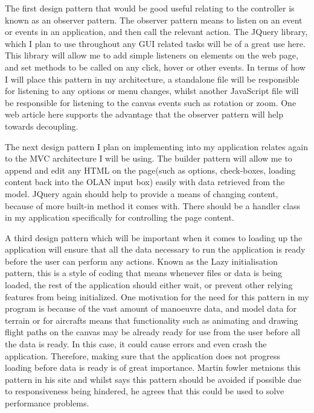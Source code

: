 The first design pattern that would be good useful relating to the controller is known as an observer pattern. The observer pattern means to listen on an event or events in an application, and then call the relevant action. The JQuery library, which I plan to use throughout any GUI related tasks will be of a great use here. This library will allow me to add simple listeners on elements on the web page, and set methods to be called on any click, hover or other events. In terms of how I will place this pattern in my architecture, a standalone file will be responsible for listening to any options or menu changes, whilst another JavaScript file will be responsible for listening to the canvas events such as rotation or zoom. One web article here \cite{observer} supports the advantage that the observer pattern will help towards decoupling.

The next design pattern I plan on implementing into my application relates again to the MVC architecture I will be using. The builder pattern will allow me to append and edit any HTML on the page(such as options, check-boxes, loading content back into the OLAN input box) easily with data retrieved from the model. JQuery again should help to provide a means of changing content, because of more built-in method it comes with. There should be a handler class in my application specifically for controlling the page content.

A third design pattern which will be important when it comes to loading up the application will ensure that all the data necessary to run the application is ready before the user can perform any actions. Known as the Lazy initialisation pattern, this is a style of coding that means whenever files or data is being loaded, the rest of the application should either wait, or prevent other relying features from being initialized. One motivation for the need for this pattern in my program is because of the vast amount of manoeuvre data, and model data for terrain or for aircrafts means that functionality such as animating and drawing flight paths on the canvas may be already ready for use from the user before all the data is ready. In this case, it could cause errors and even crash the application. Therefore, making sure that the application does not progress loading before data is ready is of great importance. Martin fowler metnions this pattern in his site \cite{lazy_initialisation} and whilst says this pattern should be avoided if possible due to responsiveness being hindered, he agrees that this could be used to solve performance problems.

